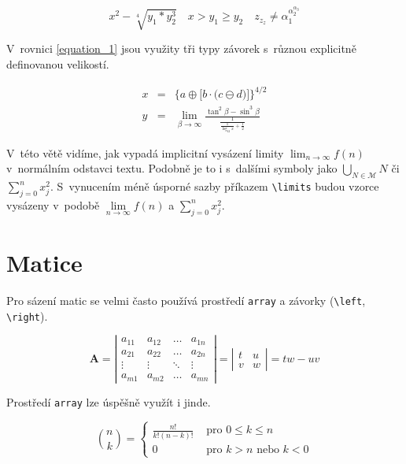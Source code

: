 \documentclass[a4paper, 11pt, twocolumn]{article}
\theoremstyle{definition}
\begin{document}
$$
x^{2}-\sqrt[4]{y_{1} * y_{2}^{3}} \quad x>y_{1} \geq y_{2} \quad z_{z_{z}} \neq \alpha_{1}^{\alpha_{2}^{\alpha_{3}}}
$$

V~rovnici \eqref{equation_1} jsou využity tři typy závorek s~různou explicitně definovanou velikostí.

\begin{eqnarray}
    \label{equation_1} x & = &\bigg\{a \oplus\Big[b \cdot\big(c \ominus d\big)\Big]\bigg\}^{4 / 2} \\
    \label{equation_2} y & = &\lim _{\beta \rightarrow \infty} \frac{\tan ^{2} \beta-\sin ^{3} \beta}{\frac{1}{\frac{1}{\log _{42} x} +\frac{1}{2}}}
\end{eqnarray}

V~této větě vidíme, jak vypadá implicitní vysázení limity $\lim_{n \rightarrow \infty} f(n)$ v~normálním odstavci textu. Podobně je to i s~dalšími symboly jako $\bigcup_{N \in \mathcal{M}} N$ či $\sum_{j=0}^{n} x_{j}^{2}$. 
S~vynucením méně úsporné sazby příkazem \verb|\limits| budou vzorce vysázeny v~podobě $\lim\limits_{n \rightarrow \infty} f(n)$ a $\sum\limits_{j=0}^{n} x_{j}^{2}$. 

\section{Matice}
Pro sázení matic se velmi často používá prostředí \texttt{array} a závorky (\verb|\left|, \verb|\right|). 

$$
\mathbf{A}=\left|
\begin{array}{cccc}
    a_{11} & a_{12} & \ldots & a_{1 n} \\
    a_{21} & a_{22} & \ldots & a_{2 n} \\
    \vdots & \vdots & \ddots & \vdots \\
    a_{m 1} & a_{m 2} & \ldots & a_{m n}
\end{array}
\right|=\left|
\begin{array}{cc}
    t & u \\
    v & w
\end{array}\right|=t w-u v
$$

Prostředí \texttt{array} lze úspěšně využít i jinde.

$$
\binom{n}{k}
=\left\{
\begin{array}{cl}
    \frac{n !}{k !(n-k) !} & \text { pro } 0 \leq k \leq n \\
    0 & \text { pro } k>n \text { nebo } k<0
\end{array}\right.
$$
\end{document}
